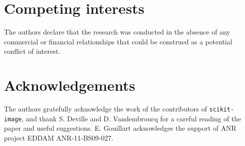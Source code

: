 \documentclass[twocolumn]{bmcart}%
\begin{document}

\begin{backmatter}

\section*{Competing interests}
The authors declare that the research was conducted
in the absence of any commercial or financial relationships that could be
construed as a potential conflict of interest.

\section*{Acknowledgements}
  
The authors gratefully acknowledge the work of the contributors of
  \texttt{scikit-image}, and thank S. Deville and D. Vandembroucq for a
  careful reading of the paper and useful suggestions. E. Gouillart
  acknowledges the support of ANR project EDDAM ANR-11-BS09-027. 


\nocite{label}


\end{backmatter}
\end{document}
